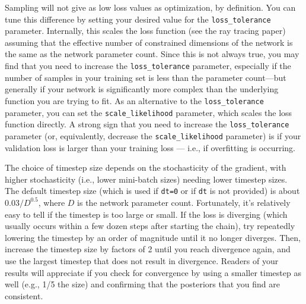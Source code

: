 \documentclass[12pt]{article}
\begin{document}
Sampling will not give as low loss values as optimization, by definition.  You can tune this difference by setting your desired value for the \lstinline{loss_tolerance} parameter.  Internally, this scales the loss function (see the ray tracing paper) assuming that the effective number of constrained dimensions of the network is the same as the network parameter count.  Since this is not always true, you may find that you need to increase the  \lstinline{loss_tolerance}  parameter, especially if the number of samples in your training set is less than the parameter count---but generally if your network is significantly more complex than the underlying function you are trying to fit.  As an alternative to the \lstinline{loss_tolerance} parameter, you can set the \lstinline{scale_likelihood} parameter, which scales the loss function directly.  A strong sign that you need to increase the \lstinline{loss_tolerance} parameter (or, equivalently, decrease the  \lstinline{scale_likelihood} parameter) is if your validation loss is larger than your training loss --- i.e., if overfitting is occurring.

The choice of timestep size depends on the stochasticity of the gradient, with higher stochasticity (i.e., lower mini-batch sizes) needing lower timestep sizes.  The default timestep size (which is used if \lstinline{dt=0} or if \lstinline{dt} is not provided) is about $0.03/D^{0.5}$, where $D$ is the network parameter count.  Fortunately, it's relatively easy to tell if the timestep is too large or small.  If the loss is diverging (which usually occurs within a few dozen steps after starting the chain), try repeatedly lowering the timestep by an order of magnitude until it no longer diverges.  Then, increase the timestep size by factors of 2 until you reach divergence again, and use the largest timestep that does not result in divergence.  Readers of your results will appreciate if you check for convergence by using a smaller timestep as well (e.g., 1/5 the size) and confirming that the posteriors that you find are consistent.
\end{document}
